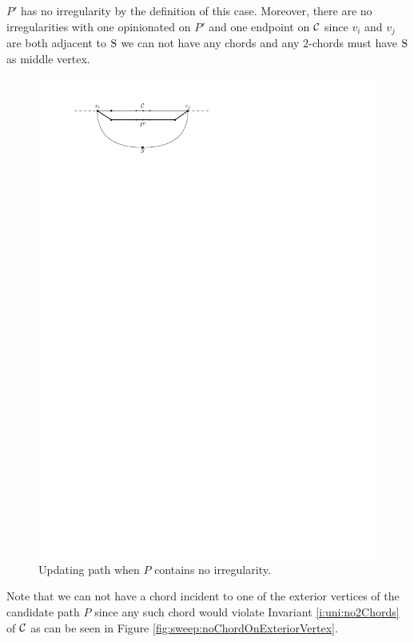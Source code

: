     $P'$ has no irregularity by the definition of this case. Moreover, there are no irregularities with one opinionated on $P'$ and one endpoint on $\mathcal{C}$ since $v_i$ and $v_j$ are both adjacent to $\mathrm{S}$ we can not have any chords and any $2$-chords must have $\mathrm{S}$ as middle vertex.
    \begin{figure}[b]
      \centering
      \includegraphics[scale=1]{unifiedAlgo/img/sweep/cases/noIrregularity}
      \caption{Updating path when $P$ contains no irregularity.}
      \label{fig:sweep:noIrregularity}
    \end{figure}

    Note that we can not have a chord incident to one of the exterior vertices of the candidate path $P$ since any such chord would violate Invariant \ref{i:uni:no2Chords} of $\mathcal{C}$ as can be seen in Figure \ref{fig:sweep:noChordOnExteriorVertex}.

